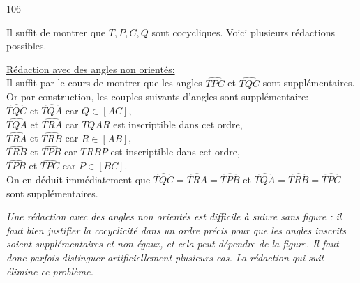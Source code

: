 \begin{Soln}{106}




Il suffit de montrer que $T, P, C, Q$ sont cocycliques. Voici plusieurs rédactions possibles.

\underline{Rédaction avec des angles non orientés:}\\
Il suffit par le cours de montrer que les angles $\widehat{TPC}$ et $\widehat{TQC}$ sont supplémentaires. Or par construction, les couples suivants d'angles sont supplémentaire: \\
$\widehat{TQC}$ et $\widehat{TQA}$ car $Q\in[AC]$,\\
$\widehat{TQA}$ et $\widehat{TRA}$ car $TQAR$ est inscriptible dans cet ordre,\\
$\widehat{TRA}$ et $\widehat{TRB}$ car $R\in[AB]$,\\
$\widehat{TRB}$ et $\widehat{TPB}$ car $TRBP$ est inscriptible dans cet ordre,\\
$\widehat{TPB}$ et $\widehat{TPC}$ car $P \in[BC]$.\\
On en déduit immédiatement que $\widehat{TQC}=\widehat{TRA}=\widehat{TPB}$ et $\widehat{TQA}=\widehat{TRB}=\widehat{TPC}$ sont supplémentaires.

\emph{Une rédaction avec des angles non orientés est difficile à suivre sans figure : il faut bien justifier la cocyclicité dans un ordre précis pour que les angles inscrits soient supplémentaires et non égaux, et cela peut dépendre de la figure. Il faut donc parfois distinguer artificiellement plusieurs cas. La rédaction qui suit élimine ce problème.}



\end{Soln}
